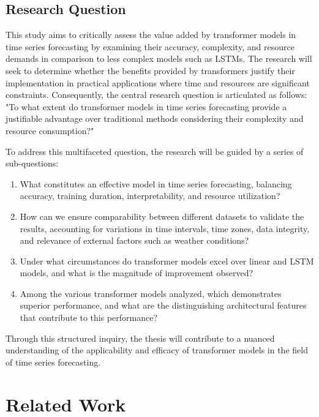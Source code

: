\documentclass{article}
\begin{document}
\subsection{Research Question}

This study aims to critically assess the value added by transformer models in time series forecasting by examining their accuracy, complexity, and resource demands in comparison to less complex models such as LSTMs. The research will seek to determine whether the benefits provided by transformers justify their implementation in practical applications where time and resources are significant constraints. Consequently, the central research question is articulated as follows: "To what extent do transformer models in time series forecasting provide a justifiable advantage over traditional methods considering their complexity and resource consumption?"

To address this multifaceted question, the research will be guided by a series of sub-questions:

\begin{enumerate}
    \item What constitutes an effective model in time series forecasting, balancing accuracy, training duration, interpretability, and resource utilization?
    \item How can we ensure comparability between different datasets to validate the results, accounting for variations in time intervals, time zones, data integrity, and relevance of external factors such as weather conditions?
    \item Under what circumstances do transformer models excel over linear and LSTM models, and what is the magnitude of improvement observed?
    \item Among the various transformer models analyzed, which demonstrates superior performance, and what are the distinguishing architectural features that contribute to this performance?
\end{enumerate}

Through this structured inquiry, the thesis will contribute to a nuanced understanding of the applicability and efficacy of transformer models in the field of time series forecasting.

\section{Related Work}
\end{document}
